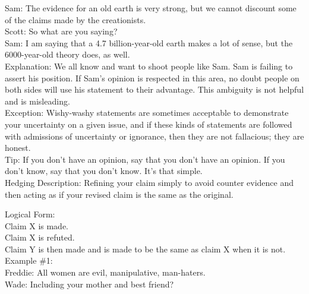 \documentclass[a4paper,12pt,single,pdftex]{scrbook}
\begin{document}
    
      Sam: The evidence for an old earth is very strong, but we cannot discount some of the claims made by the creationists.
    \\

    
      Scott: So what are you saying?
    \\

    
      Sam: I am saying that a 4.7 billion-year-old earth makes a lot of sense, but the 6000-year-old theory does, as well.
    \\

    
      Explanation: We all know and want to shoot people like Sam.  Sam is failing to assert his position.  If Sam’s opinion is respected in this area, no doubt people on both sides will use his statement to their advantage.  This ambiguity is not helpful and is misleading.
    \\

    
      Exception: Wishy-washy statements are sometimes acceptable to demonstrate your uncertainty on a given issue, and if these kinds of statements are followed with admissions of uncertainty or ignorance,  then they are not fallacious; they are honest.
    \\

    
      Tip: If you don’t have an opinion, say that you don’t have an opinion.  If you don’t know, say that you don’t know.  It’s that simple.
    \\

  

Hedging
    Description: Refining your claim simply to avoid counter evidence and then acting as if your revised claim is the same as the original.

    
      Logical Form:
    \\

    
      Claim X is made.
    \\

    
      Claim X is refuted.
    \\

    
      Claim Y is then made and is made to be the same as claim X when it is not.
    \\

    
      Example \#1:
    \\

    
      Freddie: All women are evil, manipulative, man-haters.
    \\

    
      Wade: Including your mother and best friend?
    \\
\end{document}
